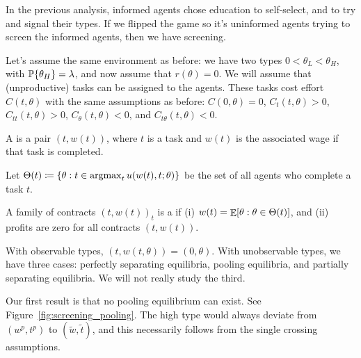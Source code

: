 \documentclass[12pt]{article}
\begin{document}
\begin{remark}
	In the previous analysis, informed agents chose education to self-select, and to try and signal their types. If we flipped the game so it's uninformed agents trying to screen the informed agents, then we have screening.
\end{remark}

\begin{model}
	Let's assume the same environment as before: we have two types $0 < \theta_L < \theta_H$, with $\mathbb{P}\{\theta_H\} = \lambda$, and now assume that $r(\theta) = 0$. We will assume that (unproductive) tasks can be assigned to the agents. These tasks cost effort $C(t,\theta)$ with the same assumptions as before: $C(0,\theta) = 0$, $C_t(t,\theta) > 0$, $C_{tt}(t,\theta) > 0$, $C_\theta(t,\theta) < 0$, and $C_{t\theta}(t,\theta)< 0$.  
\end{model}

\begin{definition}
	A  is a pair $(t,w(t))$, where $t$ is a task and $w(t)$ is the associated wage if that task is completed. 
\end{definition}

Let $\Theta(t) \coloneqq \{\theta : t \in \mathop{\rm argmax}_t u(w(t),t;\theta)\}$ be the set of all agents who complete a task $t$. 

\begin{definition}
	A family of contracts $(t,w(t))_t$ is a  if (i) $w(t) = \mathop{\mathbb{E}}[\theta : \theta \in \Theta(t)]$, and (ii) profits are zero for all contracts $(t,w(t))$. 
\end{definition}

\begin{remark}
	With observable types, $(t,w(t,\theta)) = (0,\theta)$. With unobservable types, we have three cases: perfectly separating equilibria, pooling equilibria, and partially separating equilibria. We will not really study the third.
\end{remark}

Our first result is that no pooling equilibrium can exist. See Figure~\ref{fig:screening_pooling}. The high type would always deviate from $(w^p,t^p)$ to $(\tilde{w},\tilde{t})$, and this necessarily follows from the single crossing assumptions.
\end{document}
